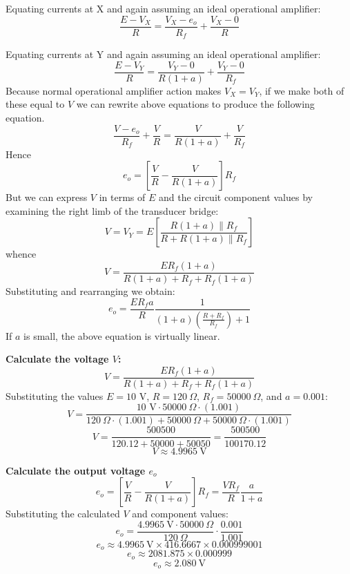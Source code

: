 \begin{solutionblock}

Equating currents at X and again assuming an ideal operational amplifier:
\[
\frac{E - V_X}{R} = \frac{V_X - e_o}{R_f} + \frac{V_X - 0}{R}
\]

Equating currents at Y and again assuming an ideal operational amplifier:
\[
\frac{E - V_Y}{R} = \frac{V_Y - 0}{R(1+a)} + \frac{V_Y - 0}{R_f}
\]
Because normal operational amplifier action makes $V_X = V_Y$, if we make 
both of these equal to $V$ we can rewrite above equations to produce the following equation.
\[
\frac{V - e_o}{R_f} + \frac{V}{R} = \frac{V}{R(1+a)} + \frac{V}{R_f}
\]
Hence
\[
e_o = \left[\frac{V}{R} - \frac{V}{R(1+a)}\right] R_f
\]
But we can express $V$ in terms of $E$ and the circuit component values by examining the right limb of the transducer bridge:
\[
V = V_Y = E \left[ \frac{R(1+a) \parallel R_f}{R + R(1+a) \parallel R_f} \right]
\]
whence
\[
V = \frac{ER_f(1+a)}{R(1+a) + R_f + R_f(1+a)}
\]
Substituting and rearranging we obtain:
\[
e_o = \frac{ER_fa}{R} \frac{1}{(1+a)\left(\frac{R+R_f}{R_f}\right) + 1}
\]
If $a$ is small, the above equation is virtually linear.


\textbf{Calculate the voltage $V$:}\\
\[
V = \frac{ER_f(1+a)}{R(1+a) + R_f + R_f(1+a)}
\]
Substituting the values $E = 10 \text{ V}$, $R = 120 \ \Omega$, $R_f = 50000 \ \Omega$, 
and $a = 0.001$:
\[
V = \frac{10 \text{ V} \cdot 50000 \ \Omega \cdot (1.001)}{120 \ \Omega \cdot (1.001) + 50000 \ \Omega + 50000 \ \Omega \cdot (1.001)}
\]
\[
V = \frac{500500}{120.12 + 50000 + 50050} = \frac{500500}{100170.12}
\]
\[
V \approx 4.9965 \ \text{V}
\]

\textbf{Calculate the output voltage $e_o$}\\
\[
e_o = \left[\frac{V}{R} - \frac{V}{R(1+a)}\right] R_f = \frac{V R_f}{R} \frac{a}{1+a}
\]
Substituting the calculated $V$ and component values:
\[
e_o = \frac{4.9965 \ \text{V} \cdot 50000 \ \Omega}{120 \ \Omega} \cdot \frac{0.001}{1.001}
\]
\[
e_o \approx 4.9965 \ \text{V} \times 416.6667 \times 0.000999001
\]
\[
e_o \approx 2081.875 \times 0.000999
\]
\[
e_o \approx 2.080 \ \text{V}
\]

\end{solutionblock}




